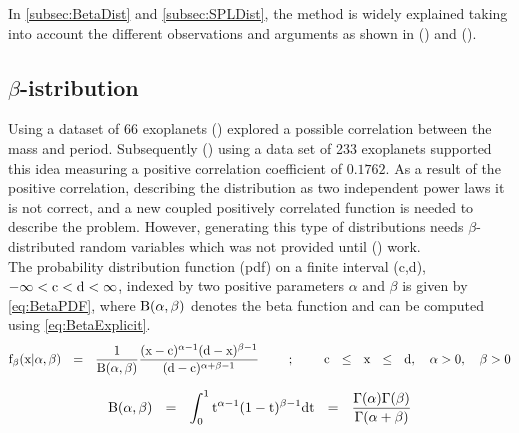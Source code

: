 In \autoref{subsec:BetaDist} and \autoref{subsec:SPLDist}, the method is widely explained taking into account the different observations and arguments as shown in  (\citeyear{2002ApJ...568L.113Z}) and  (\citeyear{2010EAS....41..107N}). 

\subsection{\texorpdfstring{$\beta$-}Distribution} \label{subsec:BetaDist}

Using a dataset of 66 exoplanets  (\citeyear{2002ApJ...568L.113Z}) explored a possible correlation between the mass and period. Subsequently  (\citeyear{1538-3881-134-5-2061}) using a data set of 233 exoplanets supported this idea measuring a positive correlation coefficient of $0.1762$. As a result of the positive correlation, describing the distribution as two independent power laws it is not correct, and a new coupled positively correlated function is needed to describe the problem. However, generating this type of distributions needs $\beta$-distributed random variables which was not provided until  (\citeyear{2004CMS...46.397M}) work.\\

The probability distribution function (pdf) on a finite interval (c,d), $-\infty < \textnormal{c} < \textnormal{d} < \infty $, indexed by two positive parameters $\alpha$ and $\beta$ is given by \autoref{eq:BetaPDF}, where $\textnormal{B}(\alpha, \beta)$ denotes the beta function and can be computed using \autoref{eq:BetaExplicit}.\\

\begingroup
\Large
\begin{equation}
 \textnormal{f}_\beta(\textnormal{x} | \alpha, \beta)~~=~~\frac{1}{\textnormal{B}(\alpha, \beta)} \frac{(\textnormal{x}-\textnormal{c})^{\alpha -1} (\textnormal{d}-\textnormal{x})^{\beta -1}}{(\textnormal{d}-\textnormal{c})^{\alpha + \beta - 1}}~~~~~~~;~~~~~~~\textnormal{c}~~ \leq ~~\textnormal{x} ~~\leq ~~\textnormal{d},~~~\alpha>0,~~~\beta>0
 \label{eq:BetaPDF}
\end{equation}
\endgroup

\begingroup
\Large
\begin{equation}
 \textnormal{B}(\alpha, \beta)~~=~~\int_0^1 \textnormal{t}^{\alpha -1}(1-\textnormal{t})^{\beta -1} \textnormal{dt}~~=~~\frac{\Gamma(\alpha)\Gamma(\beta)}{\Gamma(\alpha + \beta)}
 \label{eq:BetaExplicit}
\end{equation}
\endgroup\\

